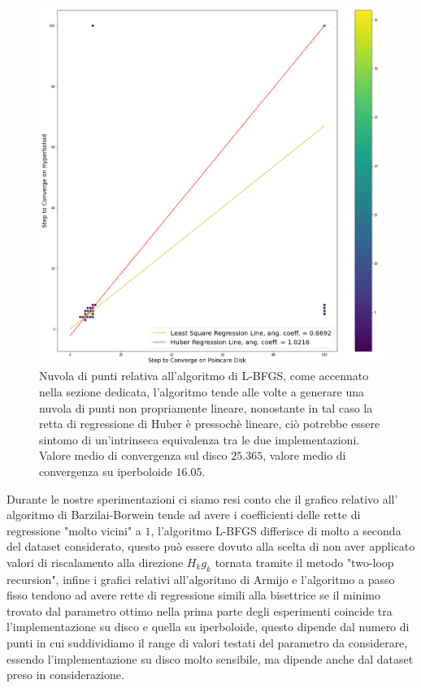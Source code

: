 \documentclass[a4paper, 12pt]{article}
\begin{document}
\begin{figure}[t] %
    \centering\includegraphics[width=1\textwidth]{l_bfgs.png}
    \caption{Nuvola di punti relativa all'algoritmo di L-BFGS, come accennato nella sezione dedicata, l'algoritmo tende alle volte a generare una nuvola di punti non propriamente lineare, nonostante in tal caso la retta di regressione di Huber è pressochè lineare, ciò potrebbe essere sintomo di un'intrinseca equivalenza tra le due implementazioni. Valore medio di convergenza sul disco $25.365$, valore medio di convergenza su iperboloide $16.05$.}
\end{figure}
Durante le nostre sperimentazioni ci siamo resi conto che il grafico relativo all' algoritmo di Barzilai-Borwein tende ad avere i coefficienti delle rette di regressione "molto vicini" a $1$, l'algoritmo L-BFGS differisce di molto a seconda del dataset considerato, questo può essere dovuto alla scelta di non aver applicato valori di riscalamento alla direzione $H_kg_k$ tornata tramite il metodo "two-loop recursion", infine i grafici relativi all'algoritmo di Armijo e l'algoritmo a passo fisso tendono ad avere rette di regressione simili alla bisettrice se il minimo trovato dal parametro ottimo nella prima parte degli esperimenti coincide tra l'implementazione su disco e quella su iperboloide, questo dipende dal numero di punti in cui suddividiamo il range di valori testati del parametro da considerare, essendo l'implementazione su disco molto sensibile, ma dipende anche dal dataset preso in considerazione.
\end{document}
